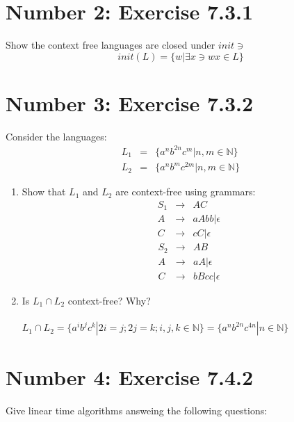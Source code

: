 \documentclass[12pt,a4paper,twoside]{article}  %
\begin{document}
\section{Number 2: Exercise 7.3.1}

Show the context free languages are closed under $init \ni$
\begin{equation}
init(L) = \{w | \exists x \ni wx \in L\}
\end{equation}

\section{Number 3: Exercise 7.3.2}

Consider the languages:
\begin{eqnarray}
L_1 &=& \{a^nb^{2n}c^m | n,m \in \mathbb{N}\} \\
L_2 &=& \{a^nb^mc^{2m} | n,m \in \mathbb{N}\}
\end{eqnarray}

\begin{enumerate}

\item Show that $L_1$ and $L_2$ are context-free using grammars:
\begin{eqnarray}
S_1 &\rightarrow& AC \nonumber\\
A   &\rightarrow& aAbb | \epsilon \nonumber\\
C   &\rightarrow& cC | \epsilon \nonumber
\end{eqnarray}
\begin{eqnarray}
S_2 &\rightarrow& AB \nonumber\\
A   &\rightarrow& aA | \epsilon \nonumber\\
C   &\rightarrow& bBcc | \epsilon \nonumber
\end{eqnarray}

\item Is $L_1 \cap L_2$ context-free? Why?
\\\\
$L_1 \cap L_2 = \{a^ib^jc^k | 2i = j; 2j = k; i,j,k \in \mathbb{N}\} =
  \{a^nb^{2n}c^{4n} | n  \in \mathbb{N}\}$

\end{enumerate}

\section{Number 4: Exercise 7.4.2}

Give linear time algorithms answeing the following questions:
\end{document}
